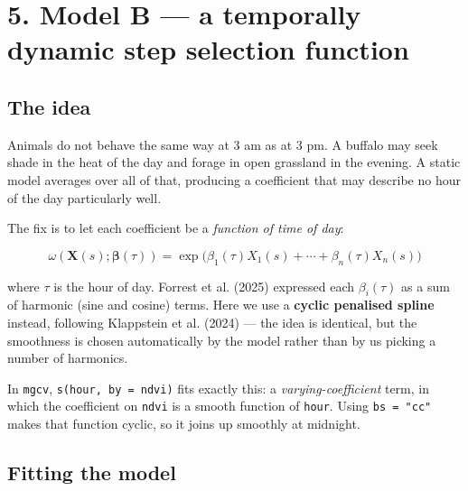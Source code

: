 \documentclass[
  letterpaper,
  DIV=11,
  numbers=noendperiod]{scrartcl}
\begin{document}
\section{5. Model B --- a temporally dynamic step selection
function}\label{model-b-a-temporally-dynamic-step-selection-function}

\subsection{The idea}\label{the-idea}

Animals do not behave the same way at 3 am as at 3 pm. A buffalo may
seek shade in the heat of the day and forage in open grassland in the
evening. A static model averages over all of that, producing a
coefficient that may describe no hour of the day particularly well.

The fix is to let each coefficient be a \emph{function of time of day}:

\[
\omega(\mathbf{X}(s); \boldsymbol{\beta}(\tau)) = \exp\big(\beta_{1}(\tau) X_1(s) + \cdots + \beta_{n}(\tau) X_n(s)\big)
\]

where \(\tau\) is the hour of day. Forrest et al. (2025) expressed each
\(\beta_i(\tau)\) as a sum of harmonic (sine and cosine) terms. Here we
use a \textbf{cyclic penalised spline} instead, following Klappstein et
al. (2024) --- the idea is identical, but the smoothness is chosen
automatically by the model rather than by us picking a number of
harmonics.

In \texttt{mgcv}, \texttt{s(hour,\ by\ =\ ndvi)} fits exactly this: a
\emph{varying-coefficient} term, in which the coefficient on
\texttt{ndvi} is a smooth function of \texttt{hour}. Using
\texttt{bs\ =\ "cc"} makes that function cyclic, so it joins up smoothly
at midnight.

\subsection{Fitting the model}\label{fitting-the-model}
\end{document}
